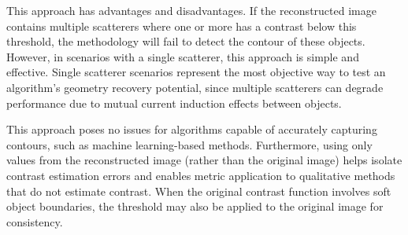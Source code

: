 \documentclass{IEEEtran}
\begin{document}
            This approach has advantages and disadvantages. If the reconstructed image contains multiple scatterers where one or more has a contrast below this threshold, the methodology will fail to detect the contour of these objects. However, in scenarios with a single scatterer, this approach is simple and effective. Single scatterer scenarios represent the most objective way to test an algorithm's geometry recovery potential, since multiple scatterers can degrade performance due to mutual current induction effects between objects.

            This approach poses no issues for algorithms capable of accurately capturing contours, such as machine learning-based methods. Furthermore, using only values from the reconstructed image (rather than the original image) helps isolate contrast estimation errors and enables metric application to qualitative methods that do not estimate contrast. When the original contrast function involves soft object boundaries, the threshold may also be applied to the original image for consistency.
			
			
\end{document}
